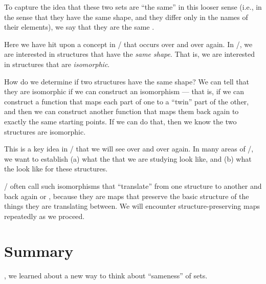 \documentclass[../../../main.tex]{subfiles}
\begin{document}
To capture the idea that these two sets are ``the same'' in this looser sense (i.e., in the sense that they have the same shape, and they differ only in the names of their elements), we say that they are the same .

Here we have hit upon a concept in \math/ that occurs over and over again. In \math/, we are interested in structures that have the \emph{same shape}. That is, we are interested in structures that are \emph{isomorphic}. 

How do we determine if two structures have the same shape? We can tell that they are isomorphic if we can construct an isomorphism --- that is, if we can construct a function that maps each part of one to a ``twin'' part of the other, and then we can construct another function that maps them back again to exactly the same starting points. If we can do that, then we know the two structures are isomorphic. 

\begin{aside}
  \begin{remark}
    This is a key idea in \math/ that we will see over and over again. In many areas of \math/, we want to establish (a) what the  that we are studying look like, and (b) what the  look like for these structures.
  \end{remark}
\end{aside}

\Mathers/ often call such isomorphisms that ``translate'' from one structure to another and back again  or , because they are maps that preserve the basic structure of the things they are translating between. We will encounter structure-preserving maps repeatedly as we proceed.


\section{Summary}

, we learned about a new way to think about ``sameness'' of sets. 
\end{document}
